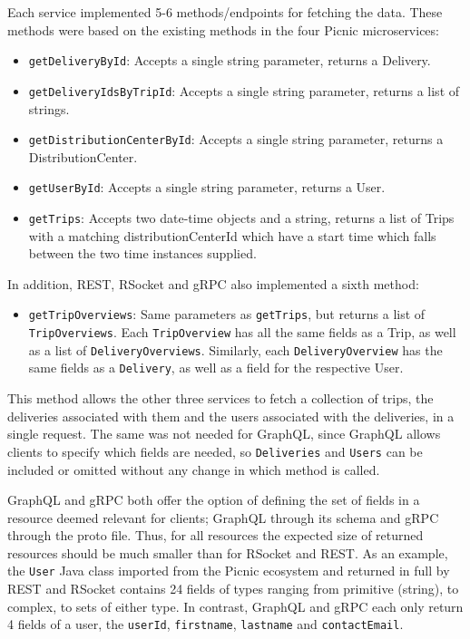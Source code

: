Each service implemented 5-6 methods/endpoints for fetching the data. These methods were based on the existing methods in the four Picnic microservices:
\begin{itemize}
    \item \texttt{getDeliveryById}: Accepts a single string parameter, returns a Delivery.
    \item \texttt{getDeliveryIdsByTripId}: Accepts a single string parameter, returns a list of strings.
    \item \texttt{getDistributionCenterById}: Accepts a single string parameter, returns a DistributionCenter.
    \item \texttt{getUserById}: Accepts a single string parameter, returns a User.
    \item \texttt{getTrips}: Accepts two date-time objects and a string, returns a list of Trips with a matching distributionCenterId which have a start time which falls between the two time instances supplied.
\end{itemize}
In addition, REST, RSocket and gRPC also implemented a sixth method:
\begin{itemize}
    \item \texttt{getTripOverviews}: Same parameters as \texttt{getTrips}, but returns a list of \texttt{TripOverviews}. Each \texttt{TripOverview} has all the same fields as a Trip, as well as a list of \texttt{DeliveryOverviews}. Similarly, each \texttt{DeliveryOverview} has the same fields as a \texttt{Delivery}, as well as a field for the respective User.
\end{itemize}
This method allows the other three services to fetch a collection of trips, the deliveries associated with them and the users associated with the deliveries, in a single request. The same was not needed for GraphQL, since GraphQL allows clients to specify which fields are needed, so \texttt{Deliveries} and \texttt{Users} can be included or omitted without any change in which method is called.

GraphQL and gRPC both offer the option of defining the set of fields in a resource deemed relevant for clients; GraphQL through its schema and gRPC through the proto file. Thus, for all resources the expected size of returned resources should be much smaller than for RSocket and REST. As an example, the \texttt{User} Java class imported from the Picnic ecosystem and returned in full by REST and RSocket contains 24 fields of types ranging from primitive (string), to complex, to sets of either type. In contrast, GraphQL and gRPC each only return 4 fields of a user, the \texttt{userId}, \texttt{firstname}, \texttt{lastname} and \texttt{contactEmail}.

